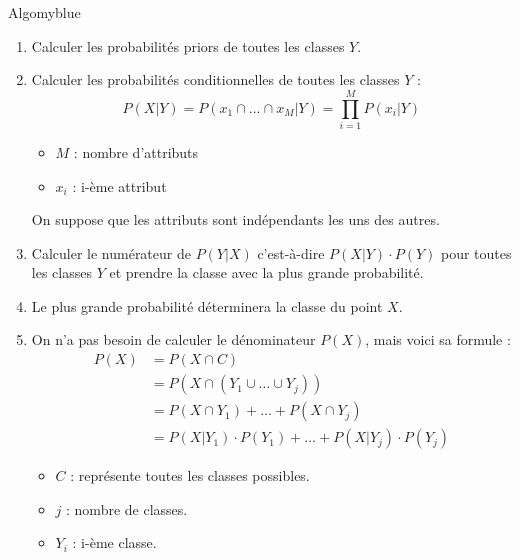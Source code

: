 \documentclass{article}
\begin{document}
\begin{prettyBox}{Algo}{myblue}
\begin{enumerate}
    \setlength{\itemsep}{0pt}
    \item Calculer les probabilités priors de toutes les classes $Y$.
    \item Calculer les probabilités conditionnelles de toutes les classes $Y$ :
        \[ P(X|Y) = P(x_1 \cap \dots \cap x_M | Y) = \prod_{i=1}^M P(x_i|Y) \]
        \begin{itemize}
            \item $M$ : nombre d'attributs
            \item $x_i$ : i-ème attribut
        \end{itemize}
        On suppose que les attributs sont indépendants les uns des autres.
    \item Calculer le numérateur de $P(Y|X)$ c'est-à-dire $P(X|Y) \cdot P(Y)$ pour toutes les classes $Y$ et prendre la classe avec la plus grande probabilité.
    \item Le plus grande probabilité déterminera la classe du point $X$.
    \item On n'a pas besoin de calculer le dénominateur $P(X)$, mais voici sa formule :
        \begin{align*}    
            P(X) &= P(X \cap C) \\[0.1cm]
                  &= P(X \cap (Y_1 \cup \dots \cup Y_j)) \\[0.1cm]
                  &= P(X\cap Y_1) + \dots + P(X\cap Y_j) \\[0.1cm]
                  &= P(X|Y_1) \cdot P(Y_1) + \dots + P(X|Y_j) \cdot P(Y_j)
        \end{align*} 
        \begin{itemize}
            \item $C$ : représente toutes les classes possibles.
            \item $j$ : nombre de classes.
            \item $Y_i$ : i-ème classe.
        \end{itemize}
\end{enumerate}
\end{prettyBox}

\newpage
\end{document}
